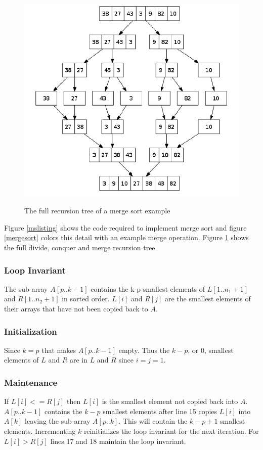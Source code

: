 \documentclass[10pt,a4paper]{article}
\begin{document}
\begin{figure}
\caption{The full recursion tree of a merge sort example}
\begin{center}
\includegraphics[scale=0.5]{../images/rmergesort.png}
\label{rmergesort}
\end{center}
\end{figure}
Figure \ref{mslisting} shows the code required to implement merge sort and figure \ref{mergesort} colors this detail with an example merge operation. Figure \ref{rmergesort} shows the full divide, conquer and merge recursion tree. 
\subsubsection{Loop Invariant}
The sub-array $A[p..k-1]$ contains the k-p smallest elements of $L[1..n_1+1]$ and $R[1..n_2+1]$ in sorted order. $L[i]$ and $R[j]$ are the smallest elements of their arrays that have not been copied back to $A$. 
\subsubsection{Initialization}
Since $k=p$ that makes $A[p..k-1]$ empty. Thus the $k-p$, or 0, smallest elements of $L$ and $R$ are in $L$ and $R$ since $i=j=1$.
\subsubsection{Maintenance}
If $L[i]<=R[j]$ then $L[i]$ is the smallest element not copied back into $A$. $A[p..k-1]$ contains the $k-p$ smallest elements after line 15 copies $L[i]$ into $A[k]$ leaving the sub-array $A[p..k]$. This will contain the $k-p+1$ smallest elements. Incrementing $k$ reinitializes the loop invariant for the next iteration. For $L[i]>R[j]$ lines 17 and 18 maintain the loop invariant.
\end{document}
